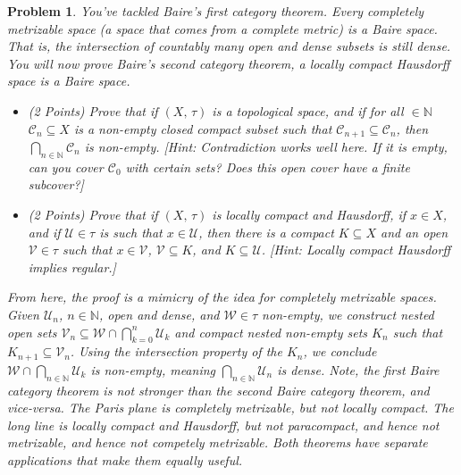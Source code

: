 \documentclass{article}
\theoremstyle{normal}
\newtheorem{problem}{Problem}
\begin{document}
    \begin{problem}
        You've tackled Baire's first category theorem. Every completely
        metrizable space (a space that comes from a complete metric) is a
        Baire space. That is, the intersection of countably
        many open and dense subsets is still dense. You will now prove Baire's
        second category theorem, a locally compact Hausdorff space is a
        Baire space.
        \begin{itemize}
            \item (2 Points)
                Prove that if $(X,\,\tau)$ is a topological space, and if for
                all $\in\mathbb{N}$ $\mathcal{C}_{n}\subseteq{X}$ is a non-empty
                closed compact subset such that
                $\mathcal{C}_{n+1}\subseteq\mathcal{C}_{n}$, then
                $\bigcap_{n\in\mathbb{N}}\mathcal{C}_{n}$ is non-empty.
                [Hint: Contradiction works well here. If it is empty, can you
                cover $\mathcal{C}_{0}$ with certain sets? Does this open cover
                have a finite subcover?]
            \item (2 Points)
                Prove that if $(X,\,\tau)$ is locally compact and Hausdorff, if
                $x\in{X}$, and if $\mathcal{U}\in\tau$ is such that
                $x\in\mathcal{U}$, then there is a compact $K\subseteq{X}$ and
                an open $\mathcal{V}\in\tau$ such that
                $x\in\mathcal{V}$, $\mathcal{V}\subseteq{K}$, and
                $K\subseteq\mathcal{U}$. [Hint: Locally compact Hausdorff
                implies regular.]
        \end{itemize}
        From here, the proof is a mimicry of the idea for completely metrizable
        spaces. Given $\mathcal{U}_{n}$, $n\in\mathbb{N}$, open and dense,
        and $\mathcal{W}\in\tau$ non-empty, we construct nested open sets
        $\mathcal{V}_{n}\subseteq\mathcal{W}\cap\bigcap_{k=0}^{n}\mathcal{U}_{k}$
        and compact nested non-empty sets $K_{n}$ such that
        $K_{n+1}\subseteq\mathcal{V}_{n}$. Using the intersection property of
        the $K_{n}$, we conclude $\mathcal{W}\cap\bigcap_{n\in\mathbb{N}}\mathcal{U}_{k}$
        is non-empty, meaning $\bigcap_{n\in\mathbb{N}}\mathcal{U}_{n}$ is
        dense. Note, the first Baire category theorem is not stronger than the
        second Baire category theorem, and vice-versa. The Paris plane is
        completely metrizable, but not locally compact. The long line is locally
        compact and Hausdorff, but not paracompact, and hence not metrizable,
        and hence not competely metrizable. Both theorems have separate
        applications that make them equally useful.
    \end{problem}
\end{document}

